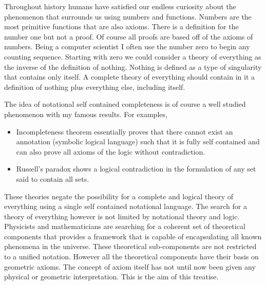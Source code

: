 Throughout history humans have satisfied our endless curiosity about the phenomenon that surrounds us using numbers and functions. Numbers are the most primitive functions that are also axioms. There is a definition for the number one but not a proof. Of course all proofs are based off of the axioms of numbers. Being a computer scientist I often use the number zero to begin any counting sequence. Starting with zero we could consider a theory of everything as the inverse of the definition of nothing. Nothing is defined as a type of singularity that contains only itself. A complete theory of everything should contain in it a definition of nothing plus everything else, including itself. 

The idea of notational self contained completeness is of course a well studied phenomenon with my famous results. For examples, 
\begin{itemize}
\item Incompleteness theorem essentially proves that there cannot exist an annotation (symbolic logical language) such that it is fully self contained and can also prove all axioms of the logic without contradiction. 
\item Russell's paradox shows a logical contradiction in the formulation of any set said to contain all sets. 
\end{itemize}

These theories negate the possibility for a complete and logical theory of everything using a single self contained notational language. The search for a theory of everything however is not limited by notational theory and logic. Physicists and mathematicians are searching for a coherent set of theoretical components that provides a framework that is capable of encapsulating all known phenomena in the universe. These theoretical sub-components are not restricted to a unified notation. However all the theoretical components have their basis on geometric axioms. The concept of axiom itself has not until now been given any physical or geometric interpretation. This is the aim of this treatise. 
